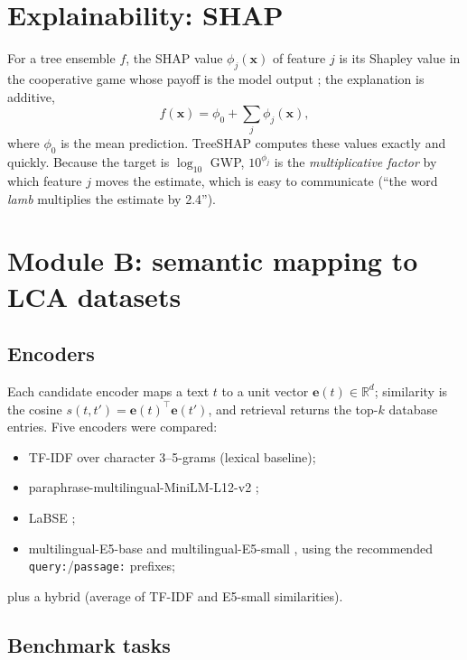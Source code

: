 \section{Explainability: SHAP}

For a tree ensemble $f$, the SHAP value $\phi_j(\mathbf{x})$ of feature $j$ is its Shapley value in
the cooperative game whose payoff is the model output \citep{lundberg2017}; the explanation is
additive,
\[
  f(\mathbf{x}) = \phi_0 + \sum_{j} \phi_j(\mathbf{x}),
\]
where $\phi_0$ is the mean prediction. TreeSHAP \citep{lundberg2020} computes these values exactly
and quickly. Because the target is $\log_{10}$ GWP, $10^{\phi_j}$ is the \emph{multiplicative
factor} by which feature $j$ moves the estimate, which is easy to communicate (``the word
\emph{lamb} multiplies the estimate by 2.4'').

\section{Module B: semantic mapping to LCA datasets}

\subsection{Encoders}

Each candidate encoder maps a text $t$ to a unit vector $\mathbf{e}(t)\in\mathbb{R}^d$; similarity
is the cosine $s(t,t')=\mathbf{e}(t)^\top\mathbf{e}(t')$, and retrieval returns the top-$k$ database
entries. Five encoders were compared:
\begin{itemize}
  \item TF-IDF over character 3--5-grams \citep{salton1988} (lexical baseline);
  \item paraphrase-multilingual-MiniLM-L12-v2 \citep{reimers2020};
  \item LaBSE \citep{feng2022labse};
  \item multilingual-E5-base and multilingual-E5-small \citep{wang2024e5}, using the
  recommended \texttt{query:}/\texttt{passage:} prefixes;
\end{itemize}
plus a hybrid (average of TF-IDF and E5-small similarities).

\subsection{Benchmark tasks}

